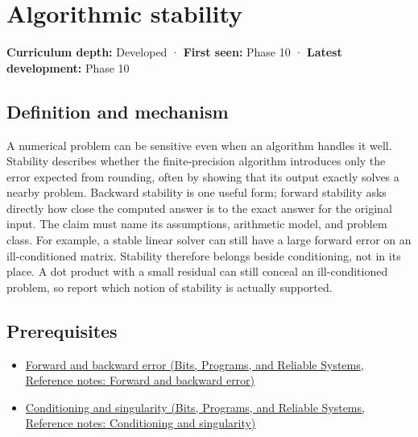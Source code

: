 \hypertarget{appendix-aa2bf0d79639}{}\label{referencestart:appendix-aa2bf0d79639}
\section{Algorithmic stability}\label{appendix-aa2bf0d79639-algorithmic-stability}

\hypertarget{appendix-aa2bf0d79639-algorithmic-stability}{}

\textbf{Curriculum depth:} Developed · \textbf{First seen:} Phase 10 · \textbf{Latest development:} Phase 10

\begin{allmightroledefinition}

\subsection{Definition and mechanism}\label{appendix-aa2bf0d79639-definition-and-mechanism}

\hypertarget{appendix-aa2bf0d79639-definition-and-mechanism}{}

A numerical problem can be sensitive even when an algorithm handles it well. Stability describes whether the finite-precision algorithm introduces only the error expected from rounding, often by showing that its output exactly solves a nearby problem. Backward stability is one useful form; forward stability asks directly how close the computed answer is to the exact answer for the original input. The claim must name its assumptions, arithmetic model, and problem class. For example, a stable linear solver can still have a large forward error on an ill-conditioned matrix. Stability therefore belongs beside conditioning, not in its place. A dot product with a small residual can still conceal an ill-conditioned problem, so report which notion of stability is actually supported.

\end{allmightroledefinition}

\subsection{Prerequisites}\label{appendix-aa2bf0d79639-prerequisites}

\hypertarget{appendix-aa2bf0d79639-prerequisites}{}

\begin{itemize}
\tightlist
\item
  \href{../01-Bits-Programs-and-Reliable-Systems/main.pdf\#nameddest=appendix-a7fbaf6d1b1c}{Forward and backward error (Bits, Programs, and Reliable Systems, Reference notes: Forward and backward error)}
\item
  \href{../01-Bits-Programs-and-Reliable-Systems/main.pdf\#nameddest=appendix-8f6a01f284a7}{Conditioning and singularity (Bits, Programs, and Reliable Systems, Reference notes: Conditioning and singularity)}
\end{itemize}

